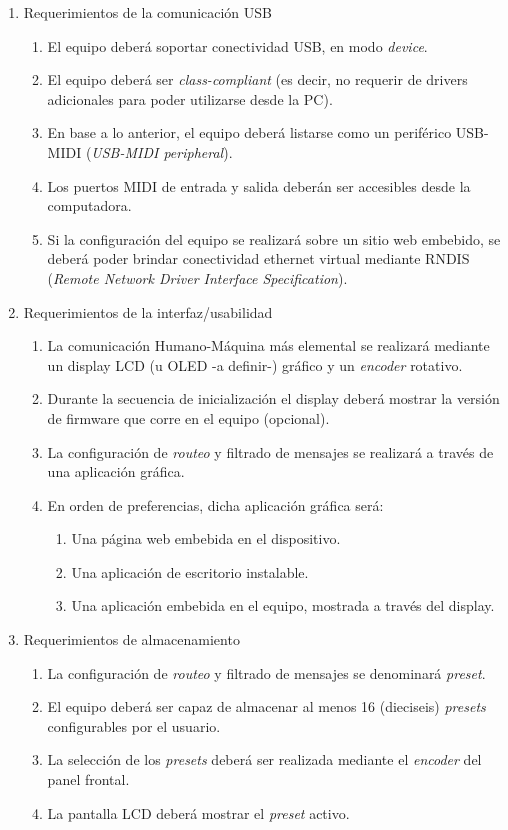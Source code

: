 \documentclass[
11pt, %
]{charter}
\begin{document}
\begin{enumerate}
	\item Requerimientos de la comunicación USB
	\begin{enumerate}
		\item El equipo deberá soportar conectividad USB, en modo \emph{device}.
		\item El equipo deberá ser \emph{class-compliant} (es decir, no requerir de drivers adicionales para poder utilizarse desde la PC).
		\item En base a lo anterior, el equipo deberá listarse como un periférico USB-MIDI (\emph{USB-MIDI peripheral}).
		\item Los puertos MIDI de entrada y salida deberán ser accesibles desde la computadora.
		\item Si la configuración del equipo se realizará sobre un sitio web embebido, se deberá poder brindar conectividad ethernet virtual mediante RNDIS (\emph{Remote Network Driver Interface Specification}).
	\end{enumerate}
	
	\item Requerimientos de la interfaz/usabilidad
	\begin{enumerate}
		\item La comunicación Humano-Máquina más elemental se realizará mediante un display LCD (u OLED -a definir-) gráfico y un \emph{encoder} rotativo.
		\item Durante la secuencia de inicialización el display deberá mostrar la versión de firmware que corre en el equipo (opcional).
		\item La configuración de \emph{routeo} y filtrado de mensajes se realizará a través de una aplicación gráfica.
		\item En orden de preferencias, dicha aplicación gráfica será:
		\begin{enumerate}
			\item Una página web embebida en el dispositivo.
			\item Una aplicación de escritorio instalable.
			\item Una aplicación embebida en el equipo, mostrada a través del display.
		\end{enumerate}
	\end{enumerate}
	
	\item Requerimientos de almacenamiento
	\begin{enumerate}
		\item La configuración de \emph{routeo} y filtrado de mensajes se denominará \emph{preset}.
		\item El equipo deberá ser capaz de almacenar al menos 16 (dieciseis) \emph{presets} configurables por el usuario.
		\item La selección de los \emph{presets} deberá ser realizada mediante el \emph{encoder} del panel frontal.
		\item La pantalla LCD deberá mostrar el \emph{preset} activo.
	\end{enumerate}	
	

\end{enumerate}
\end{document}
